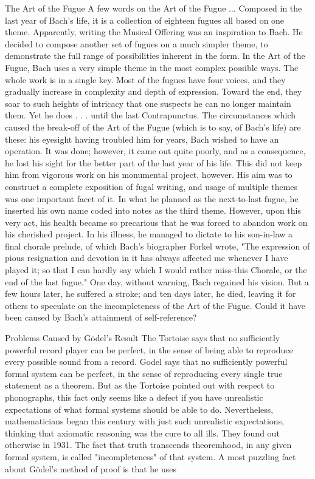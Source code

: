 The Art of the Fugue A few words on the Art of the Fugue ... Composed in the last year of Bach's life, it is a collection of eighteen fugues all based on one theme. Apparently, writing the Musical Offering was an inspiration to Bach. He decided to compose another set of fugues on a much simpler theme, to demonstrate the full range of possibilities inherent in the form. In the Art of the Fugue, Bach uses a very simple theme in the most complex possible ways. The whole work is in a single key. Most of the fugues have four voices, and they gradually increase in complexity and depth of expression. Toward the end, they soar to such heights of intricacy that one suspects he can no longer maintain them. Yet he does . . . until the last Contrapunctus. The circumstances which caused the break-off of the Art of the Fugue (which is to say, of Bach's life) are these: his eyesight having troubled him for years, Bach wished to have an operation. It was done; however, it came out quite poorly, and as a consequence, he lost his sight for the better part of the last year of his life. This did not keep him from vigorous work on his monumental project, however. His aim was to construct a complete exposition of fugal writing, and usage of multiple themes was one important facet of it. In what he planned as the next-to-last fugue, he inserted his own name coded into notes as the third theme. However, upon this very act, his health became so precarious that he was forced to abandon work on his cherished project. In his illness, he managed to dictate to his son-in-law a final chorale prelude, of which Bach's biographer Forkel wrote, "The expression of pious resignation and devotion in it has always affected me whenever I have played it; so that I can hardly say which I would rather miss-this Chorale, or the end of the last fugue." One day, without warning, Bach regained his vision. But a few hours later, he suffered a stroke; and ten days later, he died, leaving it for others to speculate on the incompleteness of the Art of the Fugue. Could it have been caused by Bach's attainment of self-reference? 

Problems Caused by Gödel’s Result The Tortoise says that no sufficiently powerful record player can be perfect, in the sense of being able to reproduce every possible sound from a record. Godel says that no sufficiently powerful formal system can be perfect, in the sense of reproducing every single true statement as a theorem. But as the Tortoise pointed out with respect to phonographs, this fact only seems like a defect if you have unrealistic expectations of what formal systems should be able to do. Nevertheless, mathematicians began this century with just such unrealistic expectations, thinking that axiomatic reasoning was the cure to all ills. They found out otherwise in 1931. The fact that truth transcends theoremhood, in any given formal system, is called "incompleteness" of that system. A most puzzling fact about Gödel’s method of proof is that he uses 







